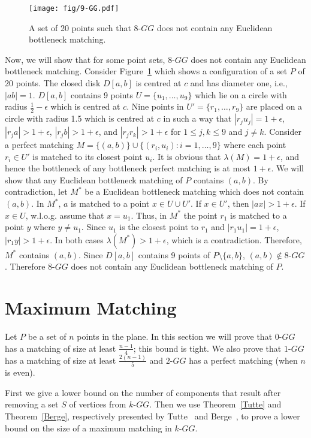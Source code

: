 \documentclass[11pt,a4paper]{article}
\newcommand{\kGG}[2]{$#1\text{-}GG#2$}
\newcommand{\CD}[2]{D[#1,#2]}
\begin{document}
\begin{figure}[htb]
  \centering
  \texttt{[image: fig/9-GG.pdf]}
 \caption{A set of 20 points such that \kGG{8}{} does not contain any Euclidean bottleneck matching.}
  \label{8-GG-fig}
\end{figure}
Now, we will show that for some point sets, \kGG{8}{} does not contain any Euclidean bottleneck matching.
Consider Figure~\ref{8-GG-fig} which shows a configuration of a set $P$ of 20 points. The closed disk $\CD{a}{b}$ is centred at $c$ and has diameter one, i.e., $|ab|=1$. $\CD{a}{b}$ contains 9 points $U=\{u_1, \dots, u_9\}$ which lie on a circle with radius $\frac{1}{2}-\epsilon$ which is centred at $c$. Nine points in $U'=\{r_1,\dots,r_9\}$ are placed on a circle with radius 1.5 which is centred at $c$ in such a way that $|r_ju_j|= 1+\epsilon$, $|r_ja|>1+\epsilon$, $|r_jb|>1+\epsilon$, and $|r_jr_k|>1+\epsilon$ for $1\le j, k\le 9$ and $j\neq k$. Consider a perfect matching $M=\{(a,b)\}\cup \{(r_i, u_i): i=1,\dots, 9\}$ where each point $r_i\in U'$ is matched to its closest point $u_i$. It is obvious that $\lambda(M)=1+\epsilon$, and hence the bottleneck of any bottleneck perfect matching is at most $1+\epsilon$. We will show that any Euclidean bottleneck matching of $P$ contains $(a,b)$. By contradiction, let $M^*$ be a Euclidean bottleneck matching which does not contain $(a,b)$. In $M^*$, $a$ is matched to a point $x\in U\cup U'$. If $x \in U'$, then $|ax|>1+\epsilon$. If $x\in U$, w.l.o.g. assume that $x = u_1$. Thus, in $M^*$ the point $r_1$ is matched to a point $y$ where $y\neq u_1$. Since $u_1$ is the closest point to $r_1$ and $|r_1u_1|=1+\epsilon$, $|r_1y|>1+\epsilon$. In both cases $\lambda(M^*)> 1+\epsilon$, which is a contradiction. Therefore, $M^*$ contains $(a,b)$. Since $\CD{a}{b}$ contains 9 points of $P\setminus\{a,b\}$, $(a,b)\notin\text{\kGG{8}{}}$. Therefore \kGG{8}{} does not contain any Euclidean bottleneck matching of $P$. 


\section{Maximum Matching}
\label{max-matching-section}
Let $P$ be a set of $n$ points in the plane. In this section we will prove that \kGG{0}{} has a matching of size at least $\frac{n-1}{4}$; this bound is tight. We also prove that \kGG{1}{} has a matching of size at least $\frac{2(n-1)}{5}$ and \kGG{2}{} has a perfect matching (when $n$ is even).

First we give a lower bound on the number of components that result after removing a set $S$ of vertices from \kGG{k}{}. Then we use Theorem~\ref{Tutte} and Theorem~\ref{Berge}, respectively presented by Tutte~\cite{Tutte1947} and Berge~\cite{Berge1958}, to prove a lower bound on the size of a maximum matching in \kGG{k}{}. 
\end{document}
